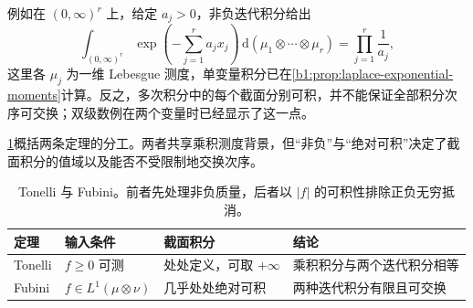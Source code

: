 例如在 \((0,\infty)^r\) 上，给定 \(a_j>0\)，非负迭代积分给出
\[
\int_{(0,\infty)^r}\exp\left(-\sum_{j=1}^{r}a_jx_j\right)\,\mathrm d(\mu_1\otimes\cdots\otimes\mu_r)
=\prod_{j=1}^{r}\frac1{a_j},
\]
这里各 \(\mu_j\) 为一维 Lebesgue 测度，单变量积分已在\cref{b1:prop:laplace-exponential-moments}计算。反之，多次积分中的每个截面分别可积，并不能保证全部积分次序可交换；双级数例在两个变量时已经显示了这一点。

\ProseParagraphBreak

\cref{b1:tab:tonelli-fubini-comparison}概括两条定理的分工。两者共享乘积测度背景，但“非负”与“绝对可积”决定了截面积分的值域以及能否不受限制地交换次序。

\begin{table}[htbp]
\centering
\small
\renewcommand{\arraystretch}{1.17}
\begin{tabularx}{\linewidth}{@{}>{\raggedright\arraybackslash}p{6.5em} >{\raggedright\arraybackslash}p{11.8em} >{\raggedright\arraybackslash}p{13.2em} >{\raggedright\arraybackslash}X@{}}
\toprule
\textbf{定理} & \textbf{输入条件} & \textbf{截面积分} & \textbf{结论} \\
\midrule
Tonelli & \(f\geq0\) 可测 & 处处定义，可取 \(+\infty\) & 乘积积分与两个迭代积分相等 \\
Fubini & \(f\in L^1(\mu\otimes\nu)\) & 几乎处处绝对可积 & 两种迭代积分有限且可交换 \\
\bottomrule
\end{tabularx}
\caption[Tonelli 与 Fubini]{Tonelli 与 Fubini。前者先处理非负质量，后者以 \(|f|\) 的可积性排除正负无穷抵消。}
\label{b1:tab:tonelli-fubini-comparison}
\end{table}
